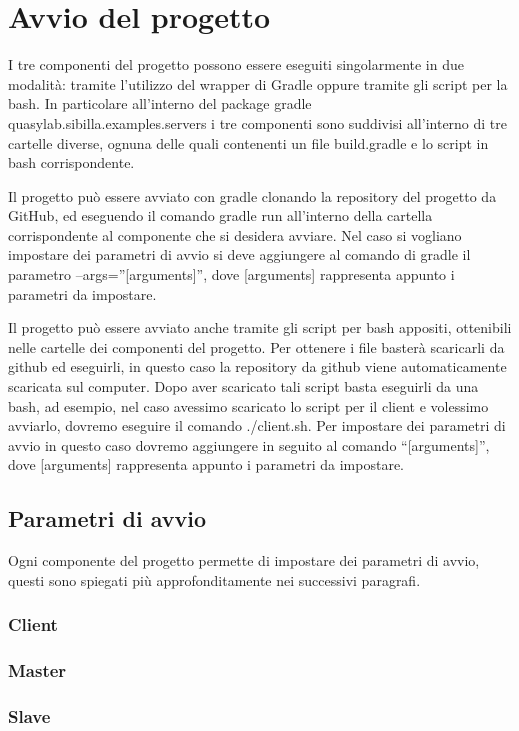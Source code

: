 
\newpage
{}

\section{Avvio del progetto}
I tre componenti del progetto possono essere eseguiti singolarmente in due modalità: tramite l’utilizzo del wrapper di Gradle oppure tramite gli script per la bash. In particolare all’interno del package gradle quasylab.sibilla.examples.servers i tre componenti sono suddivisi all’interno di tre cartelle diverse, ognuna delle quali contenenti un file build.gradle e lo script in bash corrispondente.

Il progetto può essere avviato con gradle clonando la repository del progetto da GitHub, ed eseguendo il comando gradle run all’interno della cartella corrispondente al componente che si desidera avviare. Nel caso si vogliano impostare dei parametri di avvio si deve aggiungere al comando di gradle il parametro --args=”[arguments]”, dove [arguments] rappresenta appunto i parametri da impostare.

Il progetto può essere avviato anche tramite gli script per bash appositi, ottenibili nelle cartelle dei componenti del progetto. Per ottenere i file basterà scaricarli da github ed eseguirli, in questo caso la repository da github viene automaticamente scaricata sul computer. Dopo aver scaricato tali script basta eseguirli da una bash, ad esempio, nel caso avessimo scaricato lo script per il client e volessimo avviarlo, dovremo eseguire il comando ./client.sh. Per impostare dei parametri di avvio in questo caso dovremo aggiungere in seguito al comando “[arguments]”, dove [arguments] rappresenta appunto i parametri da impostare.

\subsection{Parametri di avvio}

Ogni componente del progetto permette di impostare dei parametri di avvio, questi sono spiegati più approfonditamente nei successivi paragrafi.

\subsubsection{Client}

\subsubsection{Master}

\subsubsection{Slave}